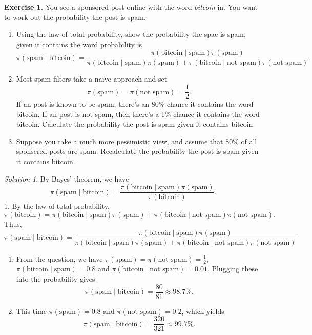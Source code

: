 \documentclass[
]{book}
\providecommand{\tightlist}{%
  \setlength{\itemsep}{0pt}\setlength{\parskip}{0pt}}
\theoremstyle{definition}
\theoremstyle{definition}
\theoremstyle{definition}
\newtheorem{exercise}{Exercise}[chapter]
\theoremstyle{definition}
\theoremstyle{remark}
\newtheorem*{solution}{Solution}
\begin{document}
\begin{exercise}

You see a sponsored post online with the word \emph{bitcoin} in. You want to work out the probability the post is spam.

\begin{enumerate}
\def\labelenumi{\arabic{enumi}.}
\tightlist
\item
  Using the law of total probability, show the probability the spac is spam, given it contains the word probability is
  \[
    \pi(\textrm{spam} \mid \textrm{bitcoin}) = \frac{\pi(\textrm{bitcoin} \mid \textrm{spam})\pi(\textrm{spam})}{\pi(\textrm{bitcoin} \mid \textrm{spam})\pi(\textrm{spam}) + \pi(\textrm{bitcoin} \mid \textrm{not spam})\pi(\textrm{not spam})}
    \]
\item
  Most spam filters take a naive approach and set
  \[
    \pi(\textrm{spam}) =\pi(\textrm{not spam}) = \frac{1}{2}. 
    \]
  If an post is known to be spam, there's an 80\% chance it contains the word bitcoin. If an post is not spam, then there's a 1\% chance it contains the word bitcoin. Calculate the probability the post is spam given it contains bitcoin.
\item
  Suppose you take a much more pessimistic view, and assume that 80\% of all sponsered posts are spam. Recalculate the probability the post is spam given it contains bitcoin.
\end{enumerate}

\end{exercise}

\begin{solution}

By Bayes' theorem, we have
\[
 \pi(\textrm{spam} \mid \textrm{bitcoin}) = \frac{\pi(\textrm{bitcoin} \mid \textrm{spam})\pi(\textrm{spam})}{\pi(\textrm{bitcoin})}.
\]
1. By the law of total probability,
\[
\pi(\textrm{bitcoin}) = \pi(\textrm{bitcoin} \mid \textrm{spam})\pi(\textrm{spam}) + \pi(\textrm{bitcoin} \mid \textrm{not spam})\pi(\textrm{not spam}). 
\]
Thus,
\[
  \pi(\textrm{spam} \mid \textrm{bitcoin}) = \frac{\pi(\textrm{bitcoin} \mid \textrm{spam})\pi(\textrm{spam})}{\pi(\textrm{bitcoin} \mid \textrm{spam})\pi(\textrm{spam}) + \pi(\textrm{bitcoin} \mid \textrm{not spam})\pi(\textrm{not spam})}
\]

\begin{enumerate}
\def\labelenumi{\arabic{enumi}.}
\setcounter{enumi}{1}
\tightlist
\item
  From the question, we have \(\pi(\textrm{spam}) =\pi(\textrm{not spam}) = \frac{1}{2}\), \(\pi(\textrm{bitcoin} \mid \textrm{spam}) = 0.8\) and \(\pi(\textrm{bitcoin} \mid \textrm{not spam}) = 0.01\). Plugging these into the probability gives
  \[
    \pi(\textrm{spam} \mid \textrm{bitcoin}) = \frac{80}{81} \approx 98.7\%.
  \]
\item
  This time \(\pi(\textrm{spam}) = 0.8\) and \(\pi(\textrm{not spam}) = 0.2\), which yields
  \[
    \pi(\textrm{spam} \mid \textrm{bitcoin}) = \frac{320}{321} \approx 99.7\%.
  \]
\end{enumerate}

\end{solution}
\end{document}
